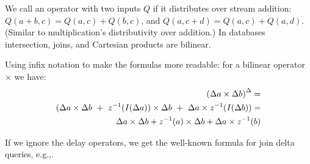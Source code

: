 We call an operator with two inputs $Q$  if it
distributes over stream addition: $Q(a+b, c) = Q(a, c) + Q(b, c)$, and
$Q(a, c+d) = Q(a, c) + Q(a, d)$.  (Similar to multiplication's
distributivity over addition.)  In databases intersection, joins, and
Cartesian products are bilinear.

Using infix notation to make the formulas more readable: for a
bilinear operator $\times$ we have:
\begin{eqnarray*}
{(\Delta a \times \Delta b)}^{\Delta} = \\
(\Delta a \times \Delta b ~+~ z^{-1}(\mathit{I}(\Delta a)) \times
\Delta b ~+~ \Delta a \times z^{-1}(\mathit{I}(\Delta b)) = \\
\Delta a \times \Delta b + z^{-1}(a) \times \Delta b + \Delta a \times z^{-1}(b)
\end{eqnarray*}

If we ignore the delay operators, we get the well-known formula for
join delta queries, e.g.,\cite{koch-pods10}.

